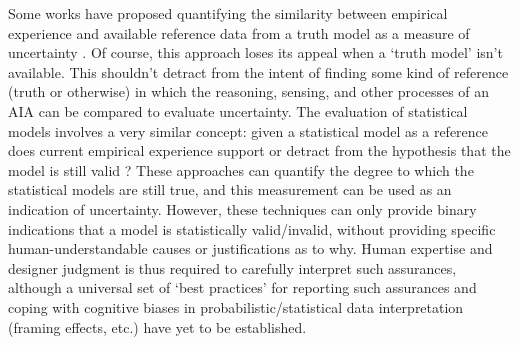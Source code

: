     Some works have proposed quantifying the similarity between empirical experience and available reference data from a truth model as a measure of uncertainty \cite{Kaipa2015-hy}. Of course, this approach loses its appeal when a `truth model' isn't available. This shouldn't detract from the intent of finding some kind of reference (truth or otherwise) in which the reasoning, sensing, and other processes of an AIA can be compared to evaluate uncertainty. The evaluation of statistical models involves a very similar concept: given a statistical model as a reference does current empirical experience support or detract from the hypothesis that the model is still valid \cite{Laskey1995-jp,Ghosh2016-dl}? These approaches can quantify the degree to which the statistical models are still true, and this measurement can be used as an indication of uncertainty. However, these techniques can only provide binary indications that a model is statistically valid/invalid, without providing specific human-understandable causes or justifications as to why. Human expertise and designer judgment is thus required to carefully interpret such assurances, although a universal set of `best practices' for reporting such assurances and coping with cognitive biases in probabilistic/statistical data interpretation (framing effects, etc.) have yet to be established. 

